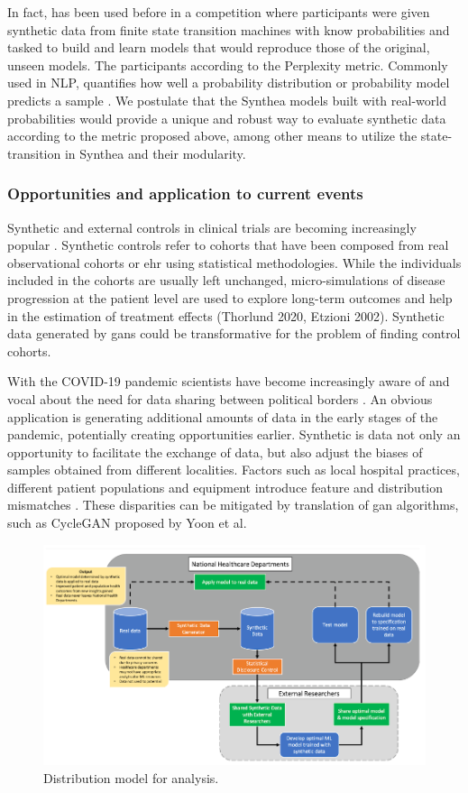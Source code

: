 In fact, has been used before in a competition where participants were given synthetic data from finite state transition machines with know probabilities and tasked to build and learn models that would reproduce those of the original, unseen models. The participants according to the Perplexity metric. Commonly used in NLP, quantifies how well a probability distribution or probability model predicts a sample \cite{Verwer_2013}. We postulate that the Synthea models built with real-world probabilities would provide a unique and robust way to evaluate synthetic data according to the metric proposed above, among other means to utilize the state-transition in Synthea and their modularity.

\subsubsection{Opportunities and application to current events}
Synthetic and external controls in clinical trials are becoming increasingly popular \cite{Thorlund2020}. Synthetic controls refer to cohorts that have been composed from real observational cohorts or \gls{ehr} using statistical methodologies. While the individuals included in the cohorts are usually left unchanged, micro-simulations of disease progression at the patient level are used to explore long-term outcomes and help in the estimation of treatment effects (Thorlund 2020, Etzioni 2002). Synthetic data generated by \glspl{gan} could be transformative for the problem of finding control cohorts.\par
With the COVID-19 pandemic scientists have become increasingly aware of and vocal about the need for data sharing between political borders \cite{Cosgriff_2020,Becker_2020,McLennan_2020}. An obvious application is generating additional amounts of data in the early stages of the pandemic, potentially creating opportunities earlier. Synthetic is data not only an opportunity to facilitate the exchange of data, but also adjust the biases of samples obtained from different localities. Factors such as local hospital practices, different patient populations and equipment introduce feature and distribution mismatches \cite{Ghassemi2020}. These disparities can be mitigated by translation of \gls{gan} algorithms, such as CycleGAN proposed by Yoon et al.

\begin{figure}[H]
    \centering
    \includegraphics{assets/rankin.png}
    \caption{Distribution model for analysis.}
    \label{fig:open-data}
\end{figure}